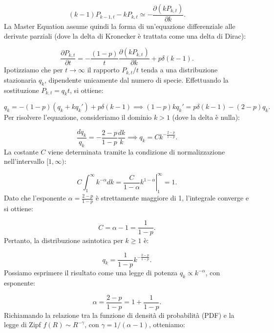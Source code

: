 \begin{equation}
    (k-1)P_{k-1,t} - k P_{k,t} \simeq - \frac{\partial (k P_{k,t})}{\partial k}.
\end{equation}
La Master Equation assume quindi la forma di un'equazione differenziale alle derivate parziali (dove la delta di Kronecker è trattata come una delta di Dirac):

\begin{equation}
    \frac{\partial P_{k,t}}{\partial t} = - \frac{(1-p)}{t} \frac{\partial (k P_{k,t})}{\partial k} + p \delta(k-1).
\end{equation}
Ipotizziamo che per $t \to \infty$ il rapporto $P_{k,t}/t$ tenda a una distribuzione stazionaria $q_k$, dipendente unicamente dal numero di specie. Effettuando la sostituzione $P_{k,t} = q_k t$, si ottiene:

\begin{equation}
    q_k = -(1-p)(q_k + k q_k') + p \delta(k-1) \implies (1-p) k q_k' = p \delta(k-1) - (2-p)q_k.
\end{equation}
Per risolvere l'equazione, consideriamo il dominio $k > 1$ (dove la delta è nulla):

\begin{equation}
    \frac{dq_k}{q_k} = - \frac{2-p}{1-p} \frac{dk}{k} \implies q_k = C k^{-\frac{2-p}{1-p}}.
\end{equation}
La costante $C$ viene determinata tramite la condizione di normalizzazione nell'intervallo $[1, \infty)$:

\begin{equation}
    C \int_{1}^{\infty} k^{-\alpha} dk = \left. \frac{C}{1-\alpha} k^{1-\alpha} \right|_{1}^{\infty} = 1.
\end{equation}
Dato che l'esponente $\alpha = \frac{2-p}{1-p}$ è strettamente maggiore di 1, l'integrale converge e si ottiene:

\begin{equation}
    C = \alpha - 1 = \frac{1}{1-p}.
\end{equation}
Pertanto, la distribuzione asintotica per $k \ge 1$ è:

\begin{equation}
    q_k = \frac{1}{1-p} k^{-\frac{2-p}{1-p}}.
\end{equation}
Possiamo esprimere il risultato come una legge di potenza $q_k \propto k^{-\alpha}$, con esponente:

\begin{equation}
    \alpha = \frac{2-p}{1-p} = 1 + \frac{1}{1-p}.
\end{equation}
Richiamando la relazione tra la funzione di densità di probabilità (PDF) e la legge di Zipf $f(R) \sim R^{-\gamma}$, con $\gamma = 1/(\alpha-1)$, otteniamo:

